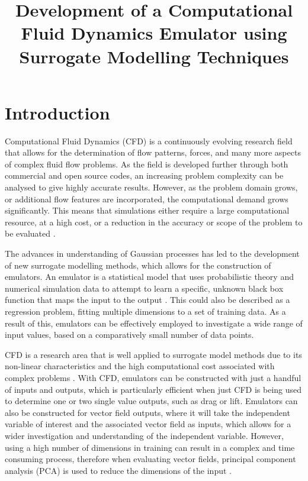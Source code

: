 \documentclass[conference]{IEEEtran}
\begin{document}
\title{Development of a Computational Fluid Dynamics Emulator using Surrogate Modelling Techniques}

\author{
}

\maketitle

\section{Introduction}
Computational Fluid Dynamics (CFD) is a continuously evolving research field that allows for the determination of flow patterns, forces, and many more aspects of complex fluid flow problems. As the field is developed further through both commercial and open source codes, an increasing problem complexity can be analysed to give highly accurate results. However, as the problem domain grows, or additional flow features are incorporated, the computational demand grows significantly. This means that simulations either require a large computational resource, at a high cost, or a reduction in the accuracy or scope of the problem to be evaluated \cite{moonen_employing_2015}.

The advances in understanding of Gaussian processes has led to the development of new surrogate modelling methods, which allows for the construction of emulators. An emulator is a statistical model that uses probabilistic theory and numerical simulation data to attempt to learn a specific, unknown black box function that maps the input to the output \cite{moonen_employing_2015} \cite{ding_full-field_2023}. This could also be described as a regression problem, fitting multiple dimensions to a set of training data. As a result of this, emulators can be effectively employed to investigate a wide range of input values, based on a comparatively small number of data points.

CFD is a research area that is well applied to surrogate model methods due to its non-linear characteristics and the high computational cost associated with complex problems \cite{moonen_employing_2015}. With CFD, emulators can be constructed with just a handful of inputs and outputs, which is particularly efficient when just CFD is being used to determine one or two single value outputs, such as drag or lift. Emulators can also be constructed for vector field outputs, where it will take the independent variable of interest and the associated vector field as inputs, which allows for a wider investigation and understanding of the independent variable. However, using a high number of dimensions in training can result in a complex and time consuming process, therefore when evaluating vector fields, principal component analysis (PCA) is used to reduce the dimensions of the input \cite{ding_full-field_2023} \cite{soize_probabilistic-learning-based_2024}.
\end{document}

